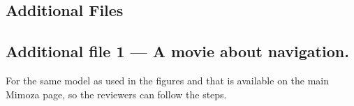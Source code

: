 \documentclass{bmcart}
\begin{document}
\begin{backmatter}


\section*{Additional Files}
  \subsection*{Additional file 1 --- A movie about navigation.}
   For the same model as used in the figures and that is available on the main Mimoza page, so the reviewers can follow the steps.


\end{backmatter}
\end{document}
